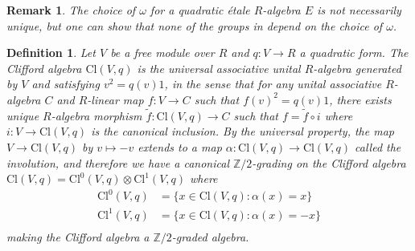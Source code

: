 \documentclass[10pt]{book}
\theoremstyle{bookplain}
\theoremstyle{bookdefinition}
\newtheorem{definition}[theorem]{Definition}
\theoremstyle{bookremark}
\newtheorem{remark}[theorem]{Remark}
\begin{document}
\begin{remark}The choice of $\omega$ for a quadratic étale $R$-algebra $E$ is not necessarily unique, but one can show that none of the groups in  depend on the choice of $\omega$. 
\end{remark}

\begin{definition}
Let $V$ be a free module over $R$ and $q:V\rightarrow R$ a quadratic form. The \textit{Clifford algebra} $\mathrm{Cl}(V,q)$ is the universal associative unital $R$-algebra generated by $V$ and satisfying $v^2=q(v)1$, in the sense that for any unital associative $R$-algebra $C$ and $R$-linear map $f:V\rightarrow C$ such that $f(v)^2=q(v)1$, there exists unique $R$-algebra morphism $\widetilde{f}:\mathrm{Cl}(V,q)\rightarrow C$ such that $f=\widetilde{f}\circ i$ where $i:V\rightarrow\mathrm{Cl}(V,q)$ is the canonical inclusion. 
By the universal property, the map $V\rightarrow\mathrm{Cl}(V,q)$ by $v\mapsto -v$ extends to a map $\alpha:\mathrm{Cl}(V,q)\rightarrow\mathrm{Cl}(V,q)$ called the \textit{involution}, and therefore we have a canonical $\mathbb Z/2$-grading on the Clifford algebra $\mathrm{Cl}(V,q)=\mathrm{Cl}^0(V,q)\otimes \mathrm{Cl}^1(V,q)$ where 
\[\begin{aligned}
    \mathrm{Cl}^0(V,q)&=\{x\in \mathrm{Cl}(V,q):\alpha(x)=x\} \\
    \mathrm{Cl}^1(V,q)&=\{x\in \mathrm{Cl}(V,q):\alpha(x)=-x\}\\
\end{aligned}\]
making the Clifford algebra a $\mathbb Z/2$-graded algebra. 
\end{definition}
\end{document}

